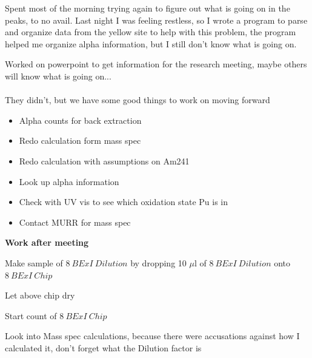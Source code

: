 \documentclass[idxtotoc,hyperref,openany,oneside]{labbook} %
\newcommand{\cmark}{\ding{51}}%
\newcommand{\done}{\rlap{$\square$}{\raisebox{2pt}{\large\hspace{1pt}\cmark}}%
  \hspace{-2.5pt}}
\begin{document}

Spent most of the morning trying again to figure out what
is going on in the peaks, to no avail. Last night I was
feeling restless, so I wrote a program to parse and organize
data from the yellow site to help with this problem,
the program helped me organize alpha information, but I still
don't know what is going on.


Worked on powerpoint to get information for the research meeting,
maybe others will know what is going on...\\~\\

They didn't, but we have some good things to work on moving forward

\begin{itemize}
\item{Alpha counts for back extraction}
\item{Redo calculation form mass spec}
\item{Redo calculation with assumptions on Am241}
\item{Look up alpha information}
\item{Check with UV vis to see which oxidation state Pu is in}
\item{Contact MURR for mass spec}
\end{itemize}

\textbf{Work after meeting}



\begin{todolist}
\item[\done]{Make sample of $\boxed{8\ BExI\ Dilution}$ by dropping
  10 $\mu$l of $\boxed{8\ BExI\ Dilution}$ onto $\boxed{8\ BExI\ Chip}$}
\item[\done]{Let above chip dry}
\item[\done]{Start count of $\boxed{8\ BExI\ Chip}$}
\item[\done]{Look into Mass spec calculations, because there were accusations
  against how I calculated it, don't forget what the Dilution factor is}
\end{todolist}




\end{document}
